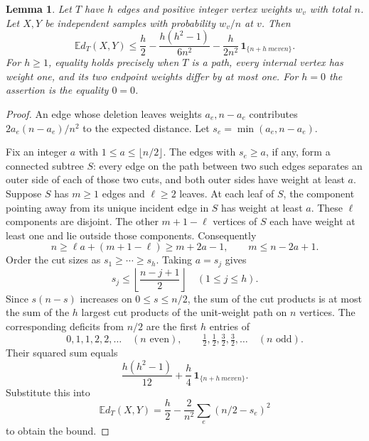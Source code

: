 \documentclass[11pt,a4paper]{article}
\newtheorem{lemma}[theorem]{Lemma}
\theoremstyle{definition}
\theoremstyle{remark}
\numberwithin{equation}{section}
\begin{document}
\begin{lemma}\label{lem:ch-exact-weighted-tree}
Let $T$ have $h$ edges and positive integer vertex weights $w_v$ with total
$n$. Let $X,Y$ be independent samples with probability $w_v/n$ at $v$.
Then
\begin{equation}\label{eq:ch-exact-weighted-tree}
 \mathbb E d_T(X,Y)
 \le \frac h2-\frac{h(h^2-1)}{6n^2}
       -\frac{h}{2n^2}\,\boldsymbol{1}_{\{n+h\ {
m even}\}}.
\end{equation}
For $h\ge1$, equality holds precisely when $T$ is a path, every internal
vertex has weight one, and its two endpoint weights differ by at most one.
For $h=0$ the assertion is the equality $0=0$.
\end{lemma}

\begin{proof}
An edge whose deletion leaves weights $a_e,n-a_e$ contributes
$2a_e(n-a_e)/n^2$ to the expected distance. Let
$s_e=\min(a_e,n-a_e)$.

Fix an integer $a$ with $1\le a\le\lfloor n/2\rfloor$. The edges with
$s_e\ge a$, if any, form a connected subtree $S$: every edge on the path
between two such edges separates an outer side of each of those two cuts,
and both outer sides have weight at least $a$. Suppose $S$ has $m\ge1$
edges and $\ell\ge2$ leaves. At each leaf of $S$, the component pointing
away from its unique incident edge in $S$ has weight at least $a$. These
$\ell$ components are disjoint. The other $m+1-\ell$ vertices of $S$
each have weight at least one and lie outside those components. Consequently
\[
 n\ge \ell a+(m+1-\ell)\ge m+2a-1,
 \qquad m\le n-2a+1.
\]
Order the cut sizes as $s_1\ge\cdots\ge s_h$. Taking $a=s_j$ gives
\[
 s_j\le \left\lfloor\frac{n-j+1}{2}\right\rfloor
       \quad(1\le j\le h).
\]
Since $s(n-s)$ increases on $0\le s\le n/2$, the sum of the cut products
is at most the sum of the $h$ largest cut products of the unit-weight path
on $n$ vertices. The corresponding deficits from $n/2$ are the first $h$
entries of
\[
 0,1,1,2,2,\ldots\quad(n\text{ even}),
 \qquad
 \tfrac12,\tfrac12,\tfrac32,\tfrac32,\ldots\quad(n\text{ odd}).
\]
Their squared sum equals
\[
 \frac{h(h^2-1)}{12}
   +\frac h4\,\boldsymbol{1}_{\{n+h\ {
m even}\}}.
\]
Substitute this into
\[
 \mathbb E d_T(X,Y)
   =\frac h2-\frac2{n^2}\sum_e(n/2-s_e)^2
\]
to obtain the bound.


\end{proof}
\end{document}
